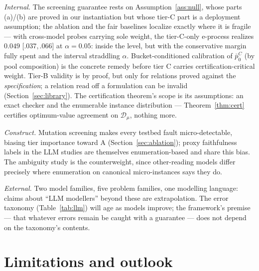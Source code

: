 \documentclass[pdflatex,sn-mathphys-num]{sn-jnl}
\theoremstyle{thmstyleone}
\theoremstyle{thmstyletwo}
\begin{document}
\emph{Internal.} The screening guarantee rests on
Assumption~\ref{ass:null}, whose parts (a)/(b) are proved in our
instantiation but whose tier-C part is a deployment assumption; the
ablation and the fair baselines localize exactly where it is
fragile --- with cross-model probes carrying sole weight, the
tier-C-only e-process realizes $0.049$ [$.037,.066$] at
$\alpha = 0.05$: inside the level, but with the conservative margin
fully spent and the interval straddling $\alpha$. Bucket-conditioned
calibration of $\bar p_0^{C}$ (by pool composition) is the concrete
remedy before tier C carries certification-critical weight. Tier-B
validity is by proof, but only for relations proved against the
\emph{specification}; a relation read off a formulation can be
invalid (Section~\ref{sec:library}). The certification theorem's
scope is its assumptions: an exact checker and the enumerable
instance distribution --- Theorem~\ref{thm:cert} certifies
optimum-value agreement on $\mathcal{D}_{\mu}$, nothing more.

\emph{Construct.} Mutation screening makes every testbed fault
micro-detectable, biasing tier importance toward A
(Section~\ref{sec:ablation}); proxy faithfulness labels in the LLM
studies are themselves enumeration-based and share this bias. The
ambiguity study is the counterweight, since other-reading models
differ precisely where enumeration on canonical micro-instances says
they do.

\emph{External.} Two model families, five problem families, one
modelling language: claims about ``LLM modellers'' beyond these are
extrapolation. The error taxonomy (Table~\ref{tab:llm}) will age as
models improve; the framework's premise --- that whatever errors
remain be caught with a guarantee --- does not depend on the
taxonomy's contents.

\section{Limitations and outlook}\label{sec:limits}
\end{document}
